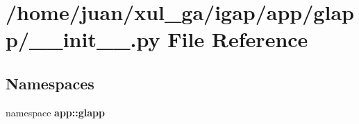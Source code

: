 \section{/home/juan/xul\_\-ga/igap/app/glapp/\_\-\_\-init\_\-\_\-.py File Reference}
\label{app_2glapp_2____init_____8py}
\subsection*{Namespaces}
\begin{CompactItemize}
\item 
namespace {\bf app::glapp}
\end{CompactItemize}
